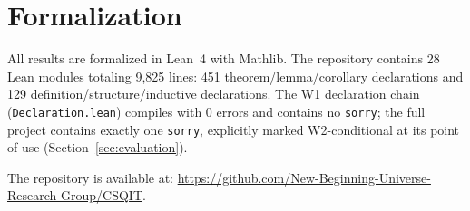 ﻿\documentclass[11pt]{article}
\begin{document}
\section{Formalization}
\label{sec:formalization}

All results are formalized in Lean~4 with Mathlib. The
repository contains 28 Lean modules totaling 9,825 lines:
451 theorem/lemma/corollary declarations and 129
definition/structure/inductive declarations. The W1
declaration chain (\texttt{Declaration.lean}) compiles
with 0 errors and contains no \texttt{sorry}; the full
project contains exactly one \texttt{sorry}, explicitly
marked W2-conditional at its point of use
(Section~\ref{sec:evaluation}).

{\sloppy
The repository is available at:
\url{https://github.com/New-Beginning-Universe-Research-Group/CSQIT}.
\par}
\end{document}
